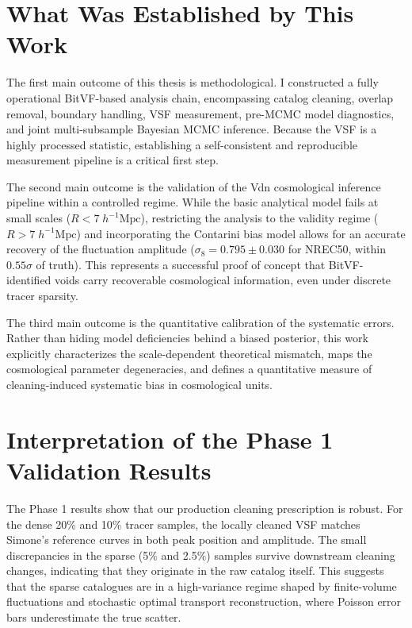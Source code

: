\documentclass[12pt]{report}
\begin{document}
\section{What Was Established by This Work}

The first main outcome of this thesis is methodological. I constructed a fully operational BitVF-based analysis chain, encompassing catalog cleaning, overlap removal, boundary handling, VSF measurement, pre-MCMC model diagnostics, and joint multi-subsample Bayesian MCMC inference. Because the VSF is a highly processed statistic, establishing a self-consistent and reproducible measurement pipeline is a critical first step.

The second main outcome is the validation of the Vdn cosmological inference pipeline within a controlled regime. While the basic analytical model fails at small scales ($R < 7\;h^{-1}\mathrm{Mpc}$), restricting the analysis to the validity regime ($R > 7\;h^{-1}\mathrm{Mpc}$) and incorporating the Contarini bias model allows for an accurate recovery of the fluctuation amplitude ($\sigma_8 = 0.795 \pm 0.030$ for NREC50, within $0.55\sigma$ of truth). This represents a successful proof of concept that BitVF-identified voids carry recoverable cosmological information, even under discrete tracer sparsity.

The third main outcome is the quantitative calibration of the systematic errors. Rather than hiding model deficiencies behind a biased posterior, this work explicitly characterizes the scale-dependent theoretical mismatch, maps the cosmological parameter degeneracies, and defines a quantitative measure of cleaning-induced systematic bias in cosmological units.

\section{Interpretation of the Phase 1 Validation Results}

The Phase 1 results show that our production cleaning prescription is robust. For the dense 20\% and 10\% tracer samples, the locally cleaned VSF matches Simone's reference curves in both peak position and amplitude. The small discrepancies in the sparse (5\% and 2.5\%) samples survive downstream cleaning changes, indicating that they originate in the raw catalog itself. This suggests that the sparse catalogues are in a high-variance regime shaped by finite-volume fluctuations and stochastic optimal transport reconstruction, where Poisson error bars underestimate the true scatter.
\end{document}
